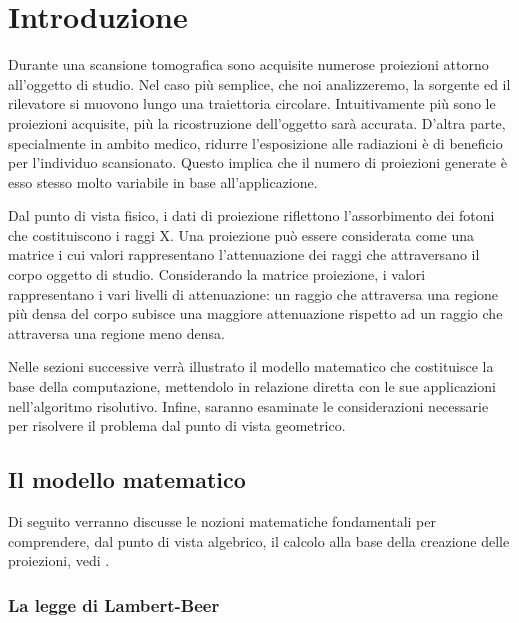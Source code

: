 \documentclass[12pt,a4paper]{report}
\begin{document}
\pagestyle{fancy}
\newpage
{}

\chapter{Introduzione} \label{chap:intro}

Durante una scansione tomografica sono acquisite numerose proiezioni attorno all'oggetto di studio.
Nel caso più semplice, che noi analizzeremo, la sorgente ed il rilevatore si muovono lungo una traiettoria circolare.
Intuitivamente più sono le proiezioni acquisite, più la ricostruzione dell'oggetto sarà accurata.
D'altra parte, specialmente in ambito medico, ridurre l'esposizione alle radiazioni è di beneficio per l'individuo scansionato.
Questo implica che il numero di proiezioni generate è esso stesso molto variabile in base all'applicazione.

Dal punto di vista fisico, i dati di proiezione riflettono l'assorbimento dei fotoni che costituiscono i raggi X.
Una proiezione può essere considerata come una matrice i cui valori rappresentano l'attenuazione dei raggi che attraversano il
corpo oggetto di studio.
Considerando la matrice proiezione, i valori rappresentano i vari livelli di attenuazione: un raggio che attraversa una regione
più densa del corpo subisce una maggiore attenuazione rispetto ad un raggio che attraversa una regione meno densa.

Nelle sezioni successive verrà illustrato il modello matematico che costituisce la base della computazione, mettendolo in
relazione diretta con le sue applicazioni nell'algoritmo risolutivo.
Infine, saranno esaminate le considerazioni necessarie per risolvere il problema dal punto di vista geometrico.

\section{Il modello matematico}

Di seguito verranno discusse le nozioni matematiche fondamentali per comprendere, dal punto di vista algebrico, il calcolo
alla base della creazione delle proiezioni, vedi \cite{MoroLoli2021}.

\subsection{La legge di Lambert-Beer}
\end{document}
